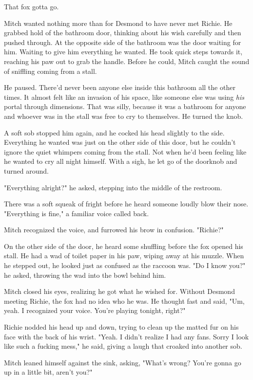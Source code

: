 That fox gotta go.

Mitch wanted nothing more than for Desmond to have never met Richie. He grabbed hold of the bathroom door, thinking about his wish carefully and then pushed through. At the opposite side of the bathroom was the door waiting for him. Waiting to give him everything he wanted. He took quick steps towards it, reaching his paw out to grab the handle. Before he could, Mitch caught the sound of sniffling coming from a stall.

He paused. There'd never been anyone else inside this bathroom all the other times. It almost felt like an invasion of his space, like someone else was using \emph{his} portal through dimensions. That was silly, because it was a bathroom for anyone and whoever was in the stall was free to cry to themselves. He turned the knob.

A soft sob stopped him again, and he cocked his head slightly to the side. Everything he wanted was just on the other side of this door, but he couldn't ignore the quiet whimpers coming from the stall. Not when he'd been feeling like he wanted to cry all night himself. With a sigh, he let go of the doorknob and turned around.

"Everything alright?" he asked, stepping into the middle of the restroom.

There was a soft squeak of fright before he heard someone loudly blow their nose. "Everything is fine," a familiar voice called back.

Mitch recognized the voice, and furrowed his brow in confusion. "Richie?"

On the other side of the door, he heard some shuffling before the fox opened his stall. He had a wad of toilet paper in his paw, wiping away at his muzzle. When he stepped out, he looked just as confused as the raccoon was. "Do I know you?" he asked, throwing the wad into the bowl behind him.

Mitch closed his eyes, realizing he got what he wished for. Without Desmond meeting Richie, the fox had no idea who he was. He thought fast and said, "Um, yeah. I recognized your voice. You're playing tonight, right?"

Richie nodded his head up and down, trying to clean up the matted fur on his face with the back of his wrist. "Yeah. I didn't realize I had any fans. Sorry I look like such a fucking mess," he said, giving a laugh that croaked into another sob.

Mitch leaned himself against the sink, asking, "What's wrong? You're gonna go up in a little bit, aren't you?"

